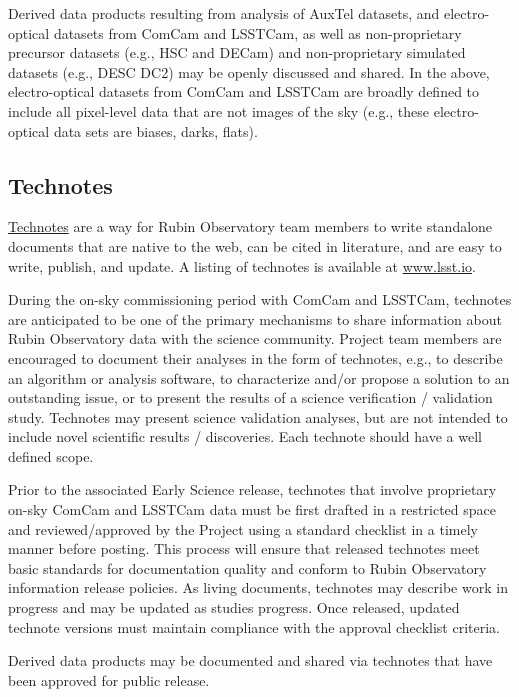 \documentclass[SE,authoryear,toc]{lsstdoc}
\begin{document}
Derived data products resulting from analysis of AuxTel datasets, and electro-optical datasets from ComCam and LSSTCam, as well as non-proprietary precursor datasets (e.g., HSC and DECam) and non-proprietary simulated datasets (e.g., DESC DC2) may be openly discussed and shared.
In the above, electro-optical datasets from ComCam and LSSTCam are broadly defined to include all pixel-level data that are not images of the sky (e.g., these electro-optical data sets are biases, darks, flats).

\subsection{Technotes}
\label{technotes}

\href{https://developer.lsst.io/project-docs/technotes.html}{Technotes} are a way for Rubin Observatory team members to write standalone documents that are native to the web, can be cited in literature, and are easy to write, publish, and update.
A listing of technotes is available at \url{www.lsst.io}.

During the on-sky commissioning period with ComCam and LSSTCam, technotes are anticipated to be one of the primary mechanisms to share information about Rubin Observatory data with the science community.
Project team members are encouraged to document their analyses in the form of technotes, e.g., to describe an algorithm or analysis software, to characterize and/or propose a solution to an outstanding issue, or to present the results of a science verification / validation study.
Technotes may present science validation analyses, but are not intended to include novel scientific results / discoveries.
Each technote should have a well defined scope.

Prior to the associated Early Science release, technotes that involve proprietary on-sky ComCam and LSSTCam data must be first drafted in a restricted space and reviewed/approved by the Project using a standard checklist in a timely manner before posting.
This process will ensure that released technotes meet basic standards for documentation quality and conform to Rubin Observatory information release policies.
As living documents, technotes may describe work in progress and may be updated as studies progress.
Once released, updated technote versions must maintain compliance with the approval checklist criteria.

Derived data products may be documented and shared via technotes that have been approved for public release.
\end{document}
